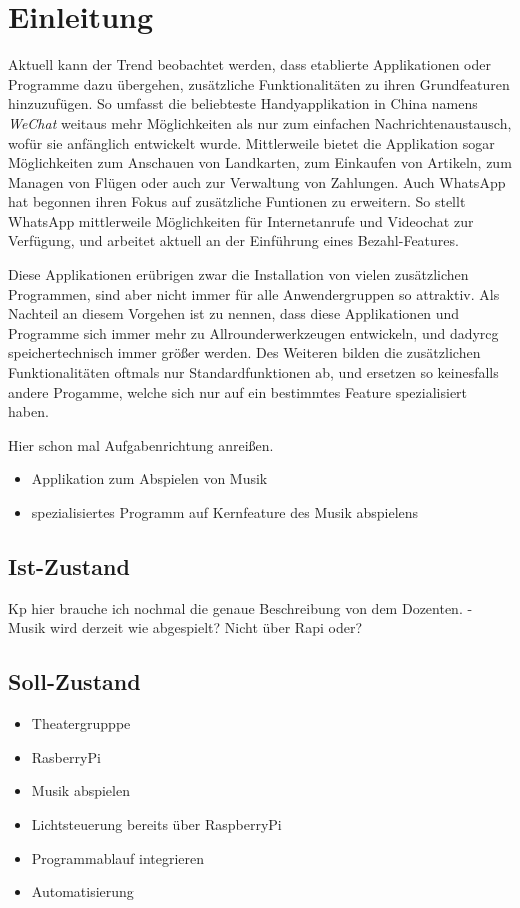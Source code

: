 
\chapter{Einleitung}
Aktuell kann der Trend beobachtet werden, dass etablierte Applikationen oder
Programme dazu übergehen, zusätzliche Funktionalitäten zu ihren Grundfeaturen
hinzuzufügen. So umfasst die beliebteste Handyapplikation in China namens
\textit{WeChat} weitaus mehr Möglichkeiten als nur zum einfachen
Nachrichtenaustausch, wofür sie anfänglich entwickelt wurde. Mittlerweile
bietet die Applikation sogar Möglichkeiten zum Anschauen von Landkarten, zum
Einkaufen von Artikeln, zum Managen von Flügen oder auch zur Verwaltung von
Zahlungen. Auch WhatsApp hat begonnen ihren Fokus auf zusätzliche Funtionen zu
erweitern. So stellt WhatsApp mittlerweile Möglichkeiten für Internetanrufe und
Videochat zur Verfügung, und arbeitet aktuell an der Einführung eines
Bezahl-Features. \break

Diese Applikationen erübrigen zwar die Installation von vielen zusätzlichen
Programmen, sind aber nicht immer für alle Anwendergruppen so attraktiv. Als
Nachteil an diesem Vorgehen ist zu nennen, dass diese Applikationen und
Programme sich immer mehr zu \glqq Allrounderwerkzeugen \grqq entwickeln, und
dadyrcg speichertechnisch immer größer werden. Des Weiteren bilden die
zusätzlichen Funktionalitäten oftmals nur Standardfunktionen ab, und ersetzen
so keinesfalls andere Progamme, welche sich nur auf ein bestimmtes Feature
spezialisiert haben. \break

Hier schon mal Aufgabenrichtung anreißen.
\begin{itemize}
\item Applikation zum Abspielen von Musik
\item spezialisiertes Programm auf Kernfeature des Musik abspielens
\end{itemize}


\section{Ist-Zustand}
Kp hier brauche ich nochmal die genaue Beschreibung von dem Dozenten. \newline
- Musik wird derzeit wie abgespielt? Nicht über Rapi oder?

\section{Soll-Zustand}
\begin{itemize}
\item Theatergrupppe
\item RasberryPi
\item Musik abspielen
\item Lichtsteuerung bereits über RaspberryPi
\item Programmablauf integrieren
\item Automatisierung
\end{itemize}

